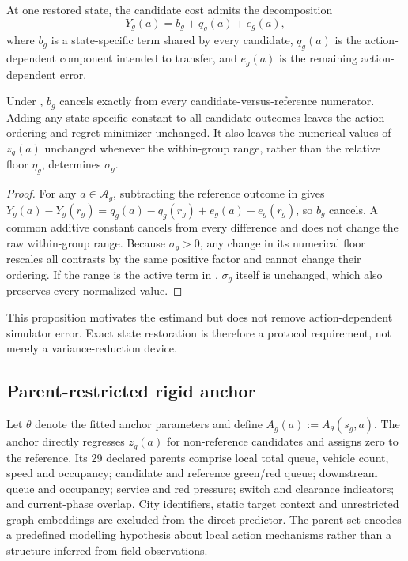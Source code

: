 \begin{assumption}
\label{ass:action-common-error}
At one restored state, the candidate cost admits the decomposition
\begin{equation}
 Y_g(a)=b_g+q_g(a)+e_g(a),
 \label{eq:additive-nuisance}
\end{equation}
where $b_g$ is a state-specific term shared by every candidate, $q_g(a)$ is
the action-dependent component intended to transfer, and $e_g(a)$ is the
remaining action-dependent error.
\end{assumption}

\begin{proposition}
\label{prop:exact-cancellation}
Under , $b_g$ cancels exactly from every
candidate-versus-reference numerator.  Adding any state-specific constant to
all candidate outcomes leaves the action ordering and regret minimizer
unchanged.  It also leaves the numerical values of $z_g(a)$ unchanged whenever
the within-group range, rather than the relative floor $\eta_g$, determines
$\sigma_g$.
\end{proposition}
\begin{proof}
For any $a\in\mathcal A_g$, subtracting the reference outcome in
 gives
$Y_g(a)-Y_g(r_g)=q_g(a)-q_g(r_g)+e_g(a)-e_g(r_g)$, so $b_g$ cancels.  A common
additive constant cancels from every difference and does not change the raw
within-group range.  Because $\sigma_g>0$, any change in its numerical floor
rescales all contrasts by the same positive factor and cannot change their
ordering.  If the range is the active term in ,
$\sigma_g$ itself is unchanged, which also preserves every normalized value.
\end{proof}

This proposition motivates the estimand but does not remove action-dependent
simulator error.  Exact state restoration is therefore a protocol requirement,
not merely a variance-reduction device.

\subsection{Parent-restricted rigid anchor}

Let $\theta$ denote the fitted anchor parameters and define
$A_g(a):=A_\theta(s_g,a)$.  The anchor directly regresses $z_g(a)$ for
non-reference candidates and assigns zero to the reference.  Its 29 declared parents comprise
local total queue, vehicle count, speed and occupancy; candidate and reference
green/red queue; downstream queue and occupancy; service and red pressure;
switch and clearance indicators; and current-phase overlap.  City identifiers,
static target context and unrestricted graph embeddings are excluded from the
direct predictor.  The parent set encodes a predefined modelling hypothesis
about local action mechanisms rather than a structure inferred from field
observations.

